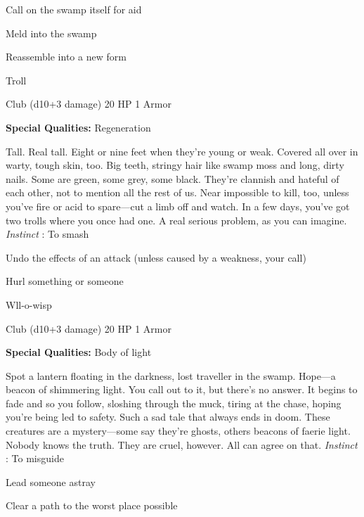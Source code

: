 \startitemize[1,packed]

\item Call on the swamp itself for aid

 
\item Meld into the swamp

 
\item Reassemble into a new form


\stopitemize
 
\startMonsterName
Troll	 
\stopMonsterName
 

Club (d10+3 damage)	20 HP	1 Armor

 


 
\startMonsterQualities
{\bf Special Qualities:}  Regeneration
\stopMonsterQualities
 
\startMonsterDescription
Tall. Real tall. Eight or nine feet when they’re young or weak. Covered all over in warty, tough skin, too. Big teeth, stringy hair like swamp moss and long, dirty nails. Some are green, some grey, some black. They’re clannish and hateful of each other, not to mention all the rest of us. Near impossible to kill, too, unless you’ve fire or acid to spare—cut a limb off and watch. In a few days, you’ve got two trolls where you once had one. A real serious problem, as you can imagine. {\em Instinct} : To smash
\stopMonsterDescription
 
\startitemize[1,packed]

\item Undo the effects of an attack (unless caused by a weakness, your call)

 
\item Hurl something or someone


\stopitemize
 
\startMonsterName
Wll-o-wisp	 
\stopMonsterName
 

Club (d10+3 damage)	20 HP	1 Armor

 


 
\startMonsterQualities
{\bf Special Qualities:}  Body of light
\stopMonsterQualities
 
\startMonsterDescription
Spot a lantern floating in the darkness, lost traveller in the swamp. Hope—a beacon of shimmering light. You call out to it, but there’s no answer. It begins to fade and so you follow, sloshing through the muck, tiring at the chase, hoping you’re being led to safety. Such a sad tale that always ends in doom. These creatures are a mystery—some say they’re ghosts, others beacons of faerie light. Nobody knows the truth. They are cruel, however. All can agree on that. {\em Instinct} : To misguide
\stopMonsterDescription
 
\startitemize[1,packed]

\item Lead someone astray

 
\item Clear a path to the worst place possible


\stopitemize
 






